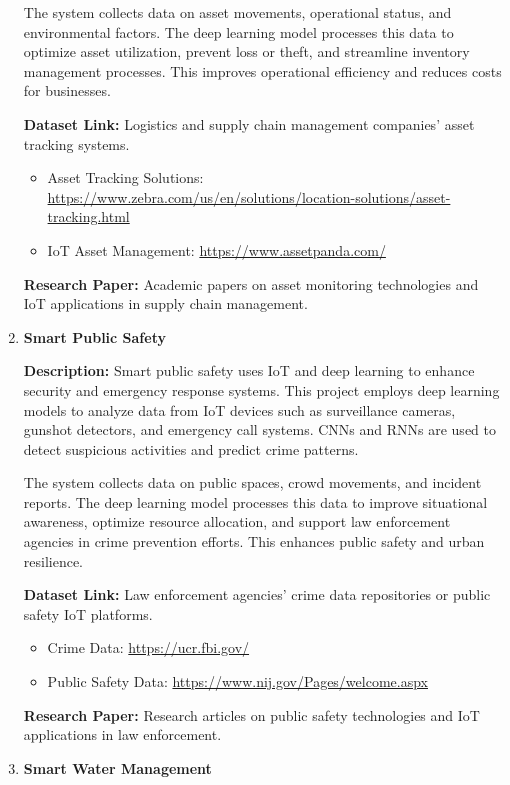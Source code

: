 \documentclass{article}
\begin{document}
\begin{enumerate}[label=\textbf{\arabic*.}, leftmargin=*]
The system collects data on asset movements, operational status, and environmental factors. The deep learning model processes this data to optimize asset utilization, prevent loss or theft, and streamline inventory management processes. This improves operational efficiency and reduces costs for businesses.

\textbf{Dataset Link:} Logistics and supply chain management companies' asset tracking systems.
\begin{itemize}
    \item Asset Tracking Solutions: \url{https://www.zebra.com/us/en/solutions/location-solutions/asset-tracking.html}
    \item IoT Asset Management: \url{https://www.assetpanda.com/}
\end{itemize}

\textbf{Research Paper:} Academic papers on asset monitoring technologies and IoT applications in supply chain management.

\item \textbf{Smart Public Safety}

\textbf{Description:}
Smart public safety uses IoT and deep learning to enhance security and emergency response systems. This project employs deep learning models to analyze data from IoT devices such as surveillance cameras, gunshot detectors, and emergency call systems. CNNs and RNNs are used to detect suspicious activities and predict crime patterns.

The system collects data on public spaces, crowd movements, and incident reports. The deep learning model processes this data to improve situational awareness, optimize resource allocation, and support law enforcement agencies in crime prevention efforts. This enhances public safety and urban resilience.

\textbf{Dataset Link:} Law enforcement agencies' crime data repositories or public safety IoT platforms.
\begin{itemize}
    \item Crime Data: \url{https://ucr.fbi.gov/}
    \item Public Safety Data: \url{https://www.nij.gov/Pages/welcome.aspx}
\end{itemize}

\textbf{Research Paper:} Research articles on public safety technologies and IoT applications in law enforcement.

\item \textbf{Smart Water Management}


\end{enumerate}
\end{document}
